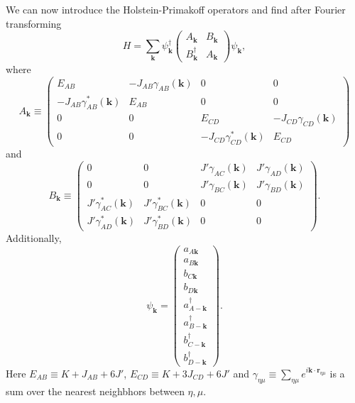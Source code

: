 We can now introduce the Holstein-Primakoff operators and find after Fourier transforming
\begin{equation}
	H = \sum_{\bm k} \psi_{\bm k}^\dagger \begin{pmatrix}
		A_{\bm k} & B_{\bm k} \\
		B_{\bm k}^\dagger & A_{\bm k}
	\end{pmatrix} \psi_{\bm k},
\end{equation}
where 
\begin{equation}
	A_{\bm k} \equiv  \begin{pmatrix}
		E_{AB} & -J_{AB}\gamma_{AB}(\bm k) & 0 & 0 \\
		-J_{AB}\gamma_{AB}^*(\bm k) & E_{AB} & 0 & 0 \\
		0 & 0 & E_{CD} & -J_{CD}\gamma_{CD}(\bm k) \\
		0 & 0 & -J_{CD}\gamma_{CD}^*(\bm k) & E_{CD}
	\end{pmatrix}
\end{equation}
and 
\begin{equation}
	B_{\bm k} \equiv \begin{pmatrix}
		0 & 0 & J'\gamma_{AC}(\bm k) & J'\gamma_{AD}(\bm k) \\
		0 & 0 & J'\gamma_{BC}(\bm k) &  J'\gamma_{BD}(\bm k) \\
		J'\gamma_{AC}^*(\bm k) & J'\gamma_{BC}^*(\bm k) & 0 & 0\\
		J'\gamma_{AD}^*(\bm k) & J'\gamma_{BD}^*(\bm k) & 0 & 0
	\end{pmatrix}.
\end{equation}
Additionally, 
\begin{equation}
	\psi_{\bm k} = \begin{pmatrix}
		a_{A\bm k} \\ a_{B\bm k} \\ b_{C\bm k} \\ b_{D\bm k} \\ a_{A-\bm k}^\dagger \\ a_{B-\bm k}^\dagger \\ b_{C-\bm k}^\dagger \\ b_{D-\bm k}^\dagger
	\end{pmatrix}.
\end{equation}
Here $E_{AB} \equiv K + J_{AB} + 6J'$, $E_{CD} \equiv K +  3J_{CD} + 6J'$ and $\gamma_{\eta\mu}\equiv \sum_{\eta\mu}e^{i\bm k\cdot \bm r_{\eta\mu}}$ is a sum over the nearest neighbhors between $\eta,\mu$.

